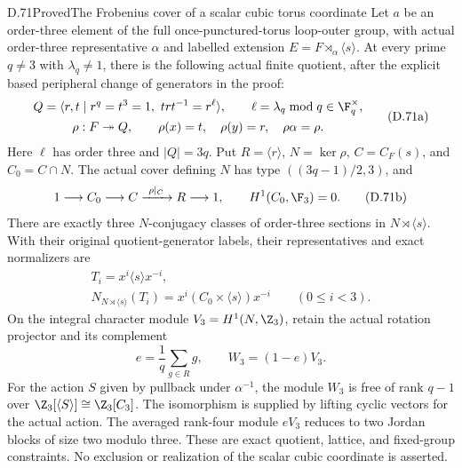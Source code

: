 \begin{claim}{D.71}{Proved}{The Frobenius cover of a scalar cubic torus coordinate}
Let $a$ be an order-three element of the full
once-punctured-torus loop-outer group, with actual
order-three representative $\alpha$ and labelled
extension $E=F\rtimes_\alpha\langle s\rangle$.
At every prime $q\ne3$ with
$\lambda_q\ne1$, there is the following actual
finite quotient, after the explicit based peripheral
change of generators in the proof:
\[
 \begin{gathered}
 Q=\langle r,t\mid r^q=t^3=1,\ trt^{-1}=r^\ell\rangle,
 \qquad
 \ell=\lambda_q\bmod q\in\F_q^\times,\\
 \rho:F\twoheadrightarrow Q,\qquad
 \rho(x)=t,\quad\rho(y)=r,\quad
 \rho\alpha=\rho .
 \end{gathered}                                                \tag{D.71a}
\]
Here $\ell$ has order three and $|Q|=3q$.
Put $R=\langle r\rangle$, $N=\ker\rho$,
$C=C_F(s)$, and $C_0=C\cap N$.
The actual cover defining $N$ has type
$((3q-1)/2,3)$, and
\[
 1\longrightarrow C_0\longrightarrow C
      \xrightarrow{\ \rho|_C\ }R\longrightarrow1,
 \qquad
                       H^1(C_0,\F_3)=0 .                    \tag{D.71b}
\]
There are exactly three $N$-conjugacy classes of
order-three sections in $N\rtimes\langle s\rangle$.
With their original quotient-generator labels,
their representatives and exact normalizers are
\[
 \begin{gathered}
 T_i=x^i\langle s\rangle x^{-i},\\
 N_{N\rtimes\langle s\rangle}(T_i)
       =x^i(C_0\times\langle s\rangle)x^{-i}
                      \qquad(0\leq i<3).
 \end{gathered}                                                \tag{D.71c}
\]
On the integral character module
$V_3=H^1(N,\Z_3)$, retain the actual rotation
projector and its complement
\[
 e=\frac1q\sum_{g\in R}g,\qquad W_3=(1-e)V_3 .
                                                               \tag{D.71d}
\]
For the action $S$ given by pullback under
$\alpha^{-1}$, the module $W_3$ is free of rank
$q-1$ over $\Z_3[\langle S\rangle]\cong\Z_3[C_3]$.
The isomorphism is supplied by lifting cyclic
vectors for the actual action.
The averaged rank-four module $eV_3$ reduces to
two Jordan blocks of size two modulo three.
These are exact quotient, lattice, and fixed-group
constraints. No exclusion or realization of the
scalar cubic coordinate is asserted.
\end{claim}
